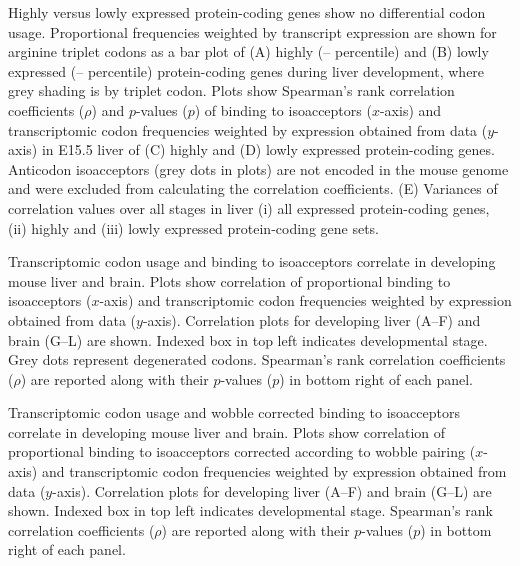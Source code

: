     {Highly versus lowly expressed protein-coding genes show no differential
    codon usage.}
    {Proportional frequencies weighted by transcript expression are shown for
    arginine triplet codons as a bar plot of (A) highly (–
    percentile) and (B) lowly expressed (– percentile)
    protein-coding genes during liver development, where grey shading is by
    triplet codon. Plots show Spearman’s rank correlation coefficients
    (\(\rho\)) and \(p\)-values (\(p\)) of  binding to \trna isoacceptors
    (\(x\)-axis) and transcriptomic codon frequencies weighted by expression
    obtained from \rnaseq data (\(y\)-axis) in E15.5 liver of (C) highly and (D)
    lowly expressed protein-coding genes. Anticodon isoacceptors (grey dots in
    plots) are not encoded in the mouse genome and were excluded from
    calculating the correlation coefficients. (E) Variances of correlation
    values over all stages in liver (i) all expressed protein-coding genes, (ii)
    highly and (iii) lowly expressed protein-coding gene sets.}

    {Transcriptomic \mrna codon usage and  binding to \trna isoacceptors
    correlate in developing mouse liver and brain.}
    {Plots show correlation of proportional  binding to \trna isoacceptors
    (\(x\)-axis) and transcriptomic codon frequencies weighted by expression
    obtained from \rnaseq data (\(y\)-axis). Correlation plots for developing
    liver (A–F) and brain (G–L) are shown. Indexed box in top left indicates
    developmental stage. Grey dots represent degenerated codons. Spearman’s rank
    correlation coefficients (\(\rho\)) are reported along with their \(p\)-values
    (\(p\)) in bottom right of each panel.}

\thispagestyle{empty}
    {Transcriptomic \mrna codon usage and wobble corrected  binding to
    \trna isoacceptors correlate in developing mouse liver and brain.}
    {Plots show correlation of proportional  binding to \trna isoacceptors
    corrected according to wobble pairing (\(x\)-axis) and transcriptomic codon
    frequencies weighted by expression obtained from \rnaseq data (\(y\)-axis).
    Correlation plots for developing liver (A–F) and brain (G–L) are shown.
    Indexed box in top left indicates developmental stage. Spearman’s rank
    correlation coefficients (\(\rho\)) are reported along with their
    \(p\)-values (\(p\)) in bottom right of each panel.}

